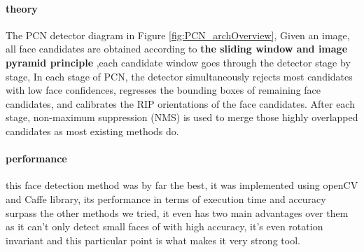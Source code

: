 \paragraph{theory}
The PCN detector diagram in Figure \ref{fig:PCN_archOverview}, Given an image, all face candidates are obtained according to \textbf{the sliding window and image pyramid principle} ,each candidate window goes through the detector stage by stage, In each stage of PCN, the detector simultaneously rejects most candidates with low face confidences, regresses the bounding boxes of remaining face candidates, and calibrates the RIP orientations of the face candidates. After each stage, non-maximum suppression (NMS) is used to merge those highly overlapped candidates as most existing methods do.
\paragraph{performance}
this face detection method was by far the best, it was implemented using openCV and Caffe library, its performance in terms of execution time and accuracy surpass the other methods we tried, it even has two main advantages over them as it can't only detect small faces of with high accuracy, it's even rotation invariant and this particular point is what makes it very strong tool.
